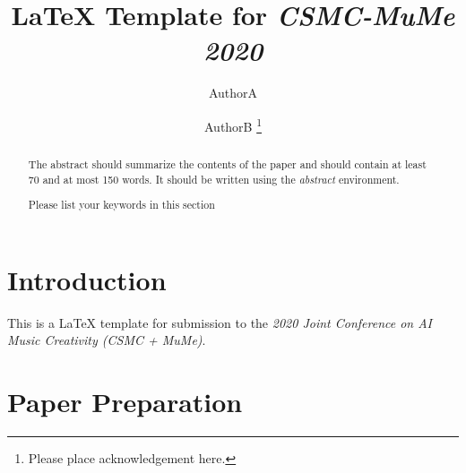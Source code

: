 \documentclass[runningheads,a4paper]{llncs}
\newcommand{\keywords}[1]{\par\addvspace\baselineskip
\noindent\keywordname\enspace\ignorespaces#1}
\begin{document}
\mainmatter  %

\title{\LaTeX{} Template for \textit{CSMC-MuMe 2020}}

%
%
\author{AuthorA\and AuthorB \thanks{Please place acknowledgement here.}}
%


%
%

\maketitle

\begin{abstract}
The abstract should summarize the contents of the paper and should
contain at least 70 and at most 150 words. It should be written using the
\textit{abstract} environment.
\keywords{Please list your keywords in this section}
\end{abstract}

\section{Introduction}

This is a \LaTeX{} template for submission to the \textit{2020 Joint Conference on AI Music Creativity (CSMC + MuMe)}.

\section{Paper Preparation}
\end{document}
